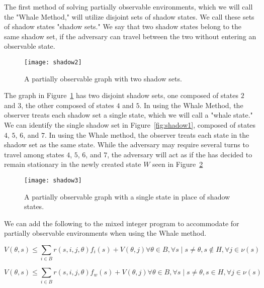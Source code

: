 The first method of solving partially observable environments, which we will call the "Whale Method," will utilize disjoint sets of shadow states. We call these sets of shadow states "shadow sets." We say that two shadow states belong to the same shadow set, if the adversary can travel between the two without entering an observable state.

\begin{figure}[h!]
\begin{center}

  \texttt{[image: shadow2]}
  \end{center}

  \caption{A partially observable graph with two shadow sets.}
  \label{fig:shadow2}
\end{figure}

The graph in Figure~\ref{fig:shadow2} has two disjoint shadow sets, one composed of states $2$ and $3$, the other composed of states $4$ and $5$. In using the Whale Method, the observer treats each shadow set a single state, which we will call a "whale state." We can identify the single shadow set in Figure~\ref{fig:shadow1}, composed of states $4$, $5$, $6$, and $7$. In using the Whale method, the observer treats each state in the shadow set as the same state. While the adversary may require several turns to travel among states $4$, $5$, $6$, and $7$, the adversary will act as if the has decided to remain stationary in the newly created state $W$ seen in Figure~\ref{fig:shadow3}

\begin{figure}[h!]
\begin{center}

  \texttt{[image: shadow3]}
  \end{center}

  \caption{A partially observable graph with a single state in place of shadow states.}
  \label{fig:shadow3}
\end{figure}

We can add the following to the mixed integer program to accommodate for partially observable environments when using the Whale method.


\begin{equation}
V(\theta, s) \leq \sum_{i \in B} r(s, i, j, \theta)f_{i}(s) + V(\theta, j) \forall\theta\in B,\forall s \mid s\neq \theta, s\not\in H, \forall j\in\nu(s) \tag{3}
\end{equation}

\begin{equation}
V(\theta, s) \leq \sum_{i \in B} r(s, i, j, \theta)f_{w}(s) + V(\theta, j) \forall\theta\in B,\forall s \mid s\neq \theta, s\in H, \forall j\in\nu(s) \tag{3}
\end{equation}


